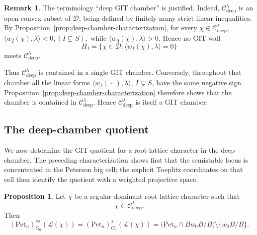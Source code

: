 \documentclass[12pt, reqno]{amsart}
\theoremstyle{plain}
\numberwithin{equation}{section}
\theoremstyle{definition}
\newtheorem{remark}{Remark}
\newtheorem{proposition}[theorem]{Proposition}
\begin{document}
\begin{remark}\label{rem:deep-is-chamber}
The terminology ``deep GIT chamber'' is justified. Indeed,
\(\mathcal C_{\mathrm{deep}}^\lambda\) is an open convex subset of
\(\mathcal D\), being defined by finitely many strict linear
inequalities. By
Proposition~\ref{prop:deep-chamber-characterization}, for every
\(\chi\in\mathcal C_{\mathrm{deep}}^\lambda\), $\langle w_I(\chi),\lambda\rangle<0, (I\subsetneq S),$ while $\langle w_0(\chi),\lambda\rangle>0.$
Hence no GIT wall
\[
H_I
=
\{\chi\in\mathcal D:
\langle w_I(\chi),\lambda\rangle=0\}
\]
meets \(\mathcal C_{\mathrm{deep}}^\lambda\).

Thus \(\mathcal C_{\mathrm{deep}}^\lambda\) is contained in a single
GIT chamber. Conversely, throughout that chamber all the linear forms
\(\langle w_I(\,\cdot\,),\lambda\rangle\), \(I\subsetneq S\), have
the same negative sign. Proposition~\ref{prop:deep-chamber-characterization}
therefore shows that the chamber is contained in
\(\mathcal C_{\mathrm{deep}}^\lambda\). Hence
\(\mathcal C_{\mathrm{deep}}^\lambda\) is itself a GIT chamber.
\end{remark}

\subsection{The deep-chamber quotient}
We now determine the GIT quotient for a root-lattice character in the
deep chamber. The preceding characterization shows first that the
semistable locus is concentrated in the Peterson big cell; the
explicit Toeplitz coordinates on that cell then identify the quotient
with a weighted projective space.

\begin{proposition}\label{prop:deep-semistable-locus}
Let \(\chi\) be a regular dominant root-lattice character such that
\[
\chi\in\mathcal C_{\mathrm{deep}}^\lambda.
\]
Then
\[
(\mathrm{Pet}_n)^{ss}_{G_0}(\mathcal L(\chi))
=
(\mathrm{Pet}_n)^s_{G_0}(\mathcal L(\chi))
=
\bigl(\mathrm{Pet}_n\cap Bw_0B/B\bigr)
\setminus\{w_0B/B\}.
\]
\end{proposition}
\end{document}
